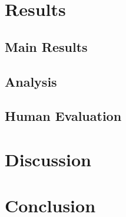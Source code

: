 \documentclass[11pt,a4paper]{article}
\begin{document}
\section{Results}

\subsection{Main Results}

\subsection{Analysis}

\subsection{Human Evaluation}

\section{Discussion}

\section{Conclusion}



\end{document}
